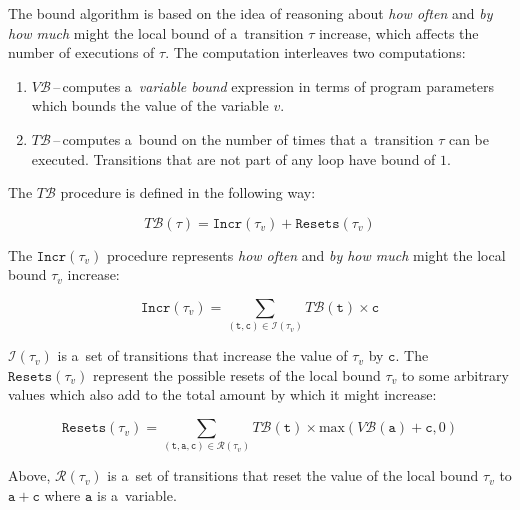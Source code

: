 \documentclass{ExcelAtFIT}
\begin{document}
The bound algorithm is based on the idea of
reasoning about \textit{how often} and
\textit{by how much} might the local bound of
a~transition $\tau$ increase, which affects
the number of executions of $\tau$. The computation
interleaves two computations:
\vspace{-2.5mm}
\begin{enumerate}
    \item $V\mathcal{B}$\,--\,computes
    a~\textit{variable bound} expression in terms of
    program parameters which bounds the value of the
    variable $v$.

    \item $T\mathcal{B}$\,--\,computes a~bound on the
    number of times that a~transition $\tau$ can be
    executed. Transitions that are not part of any
    loop have bound of $1$.
\vspace{-2.5mm}
\end{enumerate}
The $T\mathcal{B}$ procedure is defined in the following
way:
\setlength{\belowdisplayskip}{3pt}
\setlength{\abovedisplayskip}{3pt}
\begin{linenomath}
\begin{equation*}
T\mathcal{B}(\tau) =
\mathtt{Incr}(\tau_v) +
\mathtt{Resets}(\tau_v)
\end{equation*}
\end{linenomath}
The $\mathtt{Incr}(\tau_v)$ procedure
represents \textit{how often}
and \textit{by how much} might the local bound
$\tau_v$ increase:
\begin{linenomath}
\begin{equation*}
\mathtt{Incr}(\tau_v)=
\sum\limits_{(\mathtt{t, c})\in
\mathcal{I}(\tau_v)}
T\mathcal{B}(\mathtt{t})\times\mathtt{c}
\label{eq:incr_procedure}
\end{equation*}
\end{linenomath}
$\mathcal{I}(\tau_v)$ is a~set of transitions that
increase the value of $\tau_v$ by $\mathtt{c}$. The
$\mathtt{Resets}(\tau_v)$
represent the possible resets of the local bound $\tau_v$ to some
arbitrary values which also add to the total amount by
which it might increase:
\begin{linenomath}
\begin{equation*}
\mathtt{Resets}(\tau_v)=
\sum\limits_{(\mathtt{t, a, c})\in
\mathcal{R}(\tau_v)}
T\mathcal{B}(\mathtt{t})\times
\mathrm{max}(V\mathcal{B}(\mathtt{a}) + \mathtt{c}, 0)
\label{eq:resets_procedure}
\end{equation*}
\end{linenomath}
Above, $\mathcal{R}(\tau_v)$ is a~set of transitions
that reset the value of the local bound $\tau_v$ to
$\mathtt{a} + \mathtt{c}$ where $\mathtt{a}$ is
a~variable.
\end{document}

